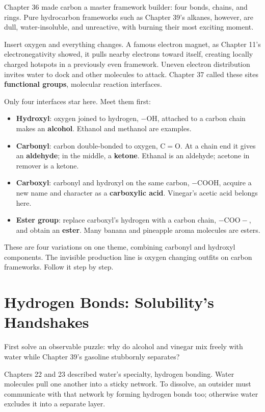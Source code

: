 Chapter 36 made carbon a master framework builder: four bonds, chains, and rings. Pure hydrocarbon frameworks such as Chapter 39's alkanes, however, are dull, water-insoluble, and unreactive, with burning their most exciting moment.

Insert oxygen and everything changes. A famous electron magnet, as Chapter 11's electronegativity showed, it pulls nearby electrons toward itself, creating locally charged hotspots in a previously even framework. Uneven electron distribution invites water to dock and other molecules to attack. Chapter 37 called these sites \textbf{functional groups}, molecular reaction interfaces.

Only four interfaces star here. Meet them first:

\begin{itemize}[itemsep=2pt]
\item \textbf{Hydroxyl}: oxygen joined to hydrogen, $-\mathrm{OH}$, attached to a carbon chain makes an \textbf{alcohol}. Ethanol and methanol are examples.
\item \textbf{Carbonyl}: carbon double-bonded to oxygen, $\mathrm{C{=}O}$. At a chain end it gives an \textbf{aldehyde}; in the middle, a \textbf{ketone}. Ethanal is an aldehyde; acetone in remover is a ketone.
\item \textbf{Carboxyl}: carbonyl and hydroxyl on the same carbon, $-\mathrm{COOH}$, acquire a new name and character as a \textbf{carboxylic acid}. Vinegar's acetic acid belongs here.
\item \textbf{Ester group}: replace carboxyl's hydrogen with a carbon chain, $-\mathrm{COO}-$, and obtain an \textbf{ester}. Many banana and pineapple aroma molecules are esters.
\end{itemize}

These are four variations on one theme, combining carbonyl and hydroxyl components. The invisible production line is oxygen changing outfits on carbon frameworks. Follow it step by step.

\section{Hydrogen Bonds: Solubility's Handshakes}

First solve an observable puzzle: why do alcohol and vinegar mix freely with water while Chapter 39's gasoline stubbornly separates?

Chapters 22 and 23 described water's specialty, hydrogen bonding. Water molecules pull one another into a sticky network. To dissolve, an outsider must communicate with that network by forming hydrogen bonds too; otherwise water excludes it into a separate layer.

